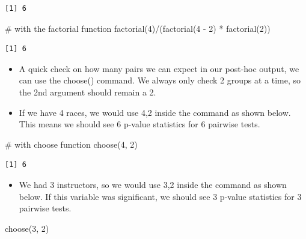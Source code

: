 \documentclass[
  letterpaper,
  DIV=11,
  numbers=noendperiod]{scrreprt}
\newenvironment{Shaded}{\begin{snugshade}}{\end{snugshade}}
\newcommand{\CommentTok}[1]{\textcolor[rgb]{0.37,0.37,0.37}{#1}}
\newcommand{\DecValTok}[1]{\textcolor[rgb]{0.68,0.00,0.00}{#1}}
\newcommand{\FunctionTok}[1]{\textcolor[rgb]{0.28,0.35,0.67}{#1}}
\newcommand{\NormalTok}[1]{\textcolor[rgb]{0.00,0.23,0.31}{#1}}
\newcommand{\SpecialCharTok}[1]{\textcolor[rgb]{0.37,0.37,0.37}{#1}}
\providecommand{\tightlist}{%
  \setlength{\itemsep}{0pt}\setlength{\parskip}{0pt}}\usepackage{longtable,booktabs,array}
\begin{document}
\begin{verbatim}
[1] 6
\end{verbatim}

\begin{Shaded}
\begin{Highlighting}[]
\CommentTok{\# with the factorial function}
\FunctionTok{factorial}\NormalTok{(}\DecValTok{4}\NormalTok{)}\SpecialCharTok{/}\NormalTok{(}\FunctionTok{factorial}\NormalTok{(}\DecValTok{4} \SpecialCharTok{{-}} \DecValTok{2}\NormalTok{) }\SpecialCharTok{*} \FunctionTok{factorial}\NormalTok{(}\DecValTok{2}\NormalTok{))}
\end{Highlighting}
\end{Shaded}

\begin{verbatim}
[1] 6
\end{verbatim}

\begin{itemize}
\tightlist
\item
  A quick check on how many pairs we can expect in our post-hoc output,
  we can use the choose() command. We always only check 2 groups at a
  time, so the 2nd argument should remain a 2.
\item
  If we have 4 races, we would use 4,2 inside the command as shown
  below. This means we should see 6 p-value statistics for 6 pairwise
  tests.\\
\end{itemize}

\begin{Shaded}
\begin{Highlighting}[]
\CommentTok{\# with choose function}
\FunctionTok{choose}\NormalTok{(}\DecValTok{4}\NormalTok{, }\DecValTok{2}\NormalTok{)}
\end{Highlighting}
\end{Shaded}

\begin{verbatim}
[1] 6
\end{verbatim}

\begin{itemize}
\tightlist
\item
  We had 3 instructors, so we would use 3,2 inside the command as shown
  below. If this variable was significant, we should see 3 p-value
  statistics for 3 pairwise tests.
\end{itemize}

\begin{Shaded}
\begin{Highlighting}[]
\FunctionTok{choose}\NormalTok{(}\DecValTok{3}\NormalTok{, }\DecValTok{2}\NormalTok{)}
\end{Highlighting}
\end{Shaded}
\end{document}
